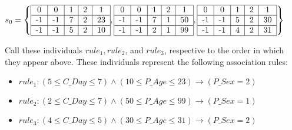 \documentclass{amsart}
\theoremstyle{definition}
\theoremstyle{remark}
\numberwithin{equation}{section}
\begin{document}
$s_0=\left \{
\begin{tabular}{ | c | c | c | c | c |}
 \hline
 0 & 0 & 1 & 2 & 1\\
 \hline
 -1  & -1 & 7 & 2 & 23 \\
\hline
 -1 & -1 & 5 & 2 & 10 \\
\hline 
\end{tabular},
\begin{tabular}{ | c | c | c | c | c |}
\hline
 0 & 0 & 1 & 2 & 1\\
 \hline
 -1  & -1 & 7 & 1 & 50 \\
\hline
 -1 & -1 & 2 & 1 & 99 \\
\hline 
\end{tabular},
\begin{tabular}{ | c | c | c | c | c |}
\hline
 0 & 0 & 1 & 2 & 1\\
 \hline
 -1  & -1 & 5 & 2 & 30 \\
\hline
 -1 & -1 & 4 & 2 & 31 \\
\hline 
\end{tabular}
\right\}$
~\newline

Call these individuals $rule_1, rule_2$, and $rule_3$, respective to the order in which they appear above. These individuals represent the following association rules:
\begin{itemize}
	\item $rule_1: (5 \leq C\_Day 
    \leq 7)\wedge(10 \leq P\_Age \leq 23)\rightarrow (P\_Sex = 2)$
    \item $rule_2: (2 \leq C\_Day 
    \leq 7)\wedge(50 \leq P\_Age \leq 99)\rightarrow (P\_Sex = 1)$
    \item $rule_3: (4 \leq C\_Day 
    \leq 5)\wedge(30 \leq P\_Age \leq 31)\rightarrow (P\_Sex = 2)$
\end{itemize}
\end{document}
